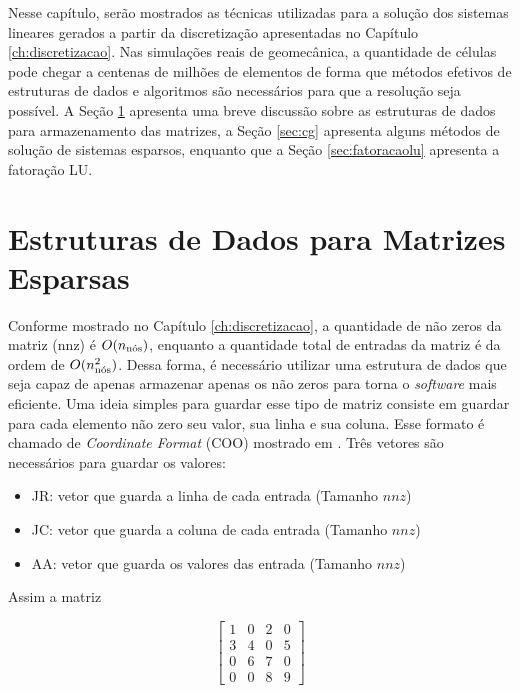 

Nesse capítulo, serão mostrados as técnicas utilizadas para a solução dos sistemas lineares gerados a partir da discretização apresentadas no Capítulo \ref{ch:discretizacao}. Nas simulações reais de geomecânica, a quantidade de células pode chegar a centenas de milhões de elementos de forma que métodos efetivos de estruturas de dados e algoritmos são necessários para que a resolução seja possível. A Seção \ref{sec:csr} apresenta uma breve discussão sobre as estruturas de dados para armazenamento das matrizes, a Seção \ref{sec:cg} apresenta alguns métodos de solução de sistemas esparsos, enquanto que a Seção \ref{sec:fatoracaolu} apresenta a fatoração LU.


\section{Estruturas de Dados para Matrizes Esparsas} \label{sec:csr}

Conforme mostrado no Capítulo \ref{ch:discretizacao}, a quantidade de não zeros da matriz (nnz) é $O(\qtdnos)$, enquanto a quantidade total de entradas da matriz é da ordem de $O(\qtdnos^2)$. Dessa forma, é necessário utilizar uma estrutura de dados que seja capaz de apenas armazenar apenas os não zeros para torna o \textit{software} mais eficiente.  Uma ideia simples para guardar esse tipo de matriz consiste em guardar para cada elemento não zero seu valor, sua linha e sua coluna. Esse formato é chamado de \textit{Coordinate Format} (COO) mostrado em \citet{solverlinear}. Três vetores são necessários para guardar os valores:


\begin{itemize}
    \item JR: vetor que guarda a linha de cada entrada (Tamanho $nnz$)
    \item JC: vetor que guarda a coluna de cada entrada (Tamanho $nnz$)
    \item AA: vetor que guarda os valores das entrada (Tamanho $nnz$)
\end{itemize}


Assim a matriz


\begin{equation}
    \begin{bmatrix}
        1 & 0 & 2 & 0\\
        3 & 4 & 0 & 5\\
        0 & 6 & 7 & 0\\
        0 & 0 & 8 &9
    \end{bmatrix}
\end{equation}

